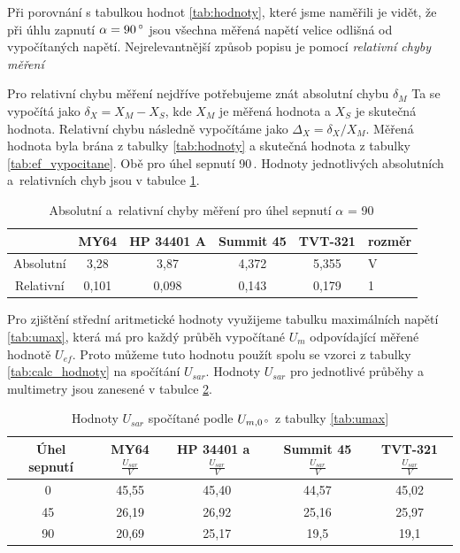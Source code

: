 \documentclass[a4paper,12pt]{article}   %
\begin{document}
Při porovnání s tabulkou hodnot \ref{tab:hodnoty}, které jsme naměřili je vidět, že při úhlu zapnutí $\alpha = 90\,\degree$ jsou všechna měřená napětí velice odlišná od vypočítaných napětí. Nejrelevantnější způsob popisu je pomocí \textit{relativní chyby měření}

Pro relativní chybu měření nejdříve potřebujeme znát absolutní chybu $\delta_M$ Ta se vypočítá jako $\delta_X=X_{M}-X_{S}$, kde $X_M$ je měřená hodnota a $X_S$ je skutečná hodnota. Relativní chybu následně vypočítáme jako $\Delta_X=\delta_X / X_{M}$. Měřená hodnota byla brána z tabulky \ref{tab:hodnoty} a skutečná hodnota z tabulky \ref{tab:ef_vypocitane}. Obě pro úhel sepnutí 90\,\textdegree. Hodnoty jednotlivých absolutních a~relativních chyb jsou v tabulce \ref{tab:relchyba}.

\begin{table}[h!]
    \centering
    \begin{tabular}{|c|c|c|c|c|l|}
    \hline
     \rule{0pt}{2.5ex}& MY64& HP 34401 A& Summit 45 & TVT-321 & rozměr\\[.7ex]\hline\hline
    Absolutní   &3,28   &3,87	&4,372	&5,355& V\\\hline
    Relativní   &0,101  &0,098	&0,143	&0,179& 1\\\hline
    \end{tabular}
    \caption{Absolutní a~relativní chyby měření pro úhel sepnutí $\alpha$ = 90\,\textdegree}
    \label{tab:relchyba}
\end{table}

Pro zjištění střední aritmetické hodnoty využijeme tabulku maximálních napětí \ref{tab:umax}, která má pro každý průběh vypočítané $U_m$ odpovídající měřené hodnotě ${U_{ef}}$. Proto můžeme tuto hodnotu použít spolu se vzorci z tabulky \ref{tab:calc_hodnoty} na spočítání $U_{sar}$. Hodnoty $U_{sar}$ pro jednotlivé průběhy a multimetry jsou zanesené v tabulce \ref{tab:sar}.

\begin{table}[h!]
    \centering
    \begin{tabular}{|c|c|c|c|c|}
    \hline
     \rule{0pt}{2.5ex} Úhel sepnutí & MY64 $\frac{U_{sar}}{V}$ & HP 34401 a~$\frac{U_{sar}}{V}$ & Summit 45 $\frac{U_{sar}}{V}$ & TVT-321 $\frac{U_{sar}}{V}$\\[.7ex]\hline\hline
    0~\textdegree	&45,55	&45,40	&44,57	&45,02\\\hline
    45~\textdegree	&26,19	&26,92	&25,16	&25,97\\\hline
    90~\textdegree	&20,69	&25,17	&19,5	&19,1\\\hline
    \end{tabular}
    \caption{Hodnoty $U_{sar}$ spočítané podle $U_{m,0\,\degree}$ z tabulky \ref{tab:umax}}
    \label{tab:sar}
\end{table}
\end{document}
